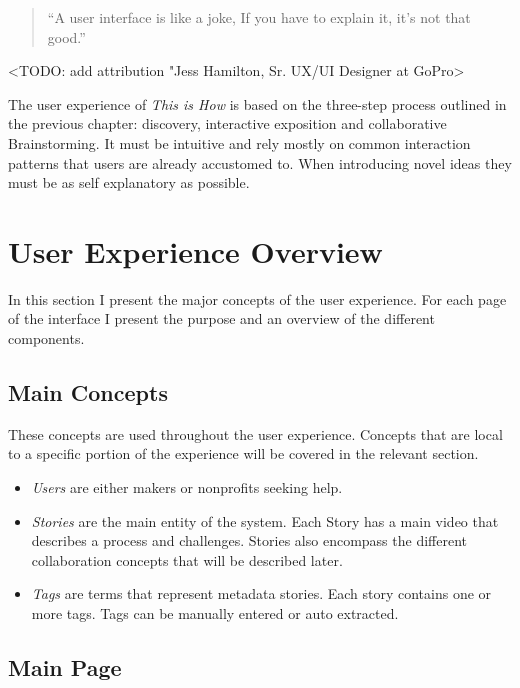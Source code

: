 \begin{quotation}
``A user interface is like a joke, If you have to explain it, it's not that good.''
\end{quotation}

<TODO: add attribution "Jess Hamilton, Sr. UX/UI Designer at GoPro>

The user experience of \textit{This is How} is based on the three-step process outlined in the previous chapter: discovery, interactive exposition and collaborative Brainstorming. It must be intuitive and rely mostly on common interaction patterns that users are already accustomed to. When introducing novel ideas they must be as self explanatory as possible. 

\section{User Experience Overview}

In this section I present the major concepts of the user experience. For each page of the interface I present the purpose and an overview of the different components. 

\subsection{Main Concepts}

These concepts are used throughout the user experience. Concepts that are local to a specific portion of the experience will be covered in the relevant section.

\begin{itemize}
\item \textit{Users} are either makers or nonprofits seeking help.

\item \textit{Stories} are the main entity of the system. Each Story has a main video that describes a process and challenges. Stories also encompass the different collaboration concepts that will be described later.

\item \textit{Tags} are terms that represent metadata stories. Each story contains one or more tags. Tags can be manually entered or auto extracted. 
\end{itemize}


\subsection{Main Page}

